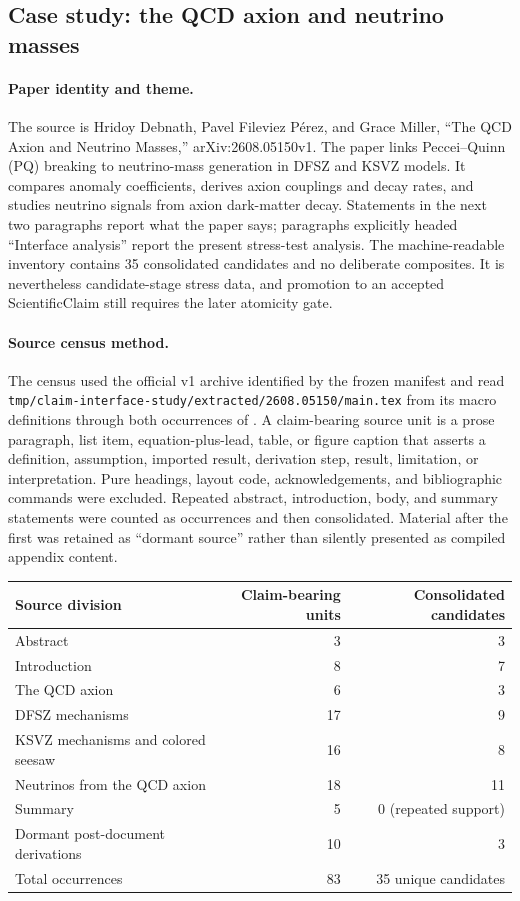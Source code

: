 \subsection{Case study: the QCD axion and neutrino masses}
\label{case:2608-05150}

\paragraph{Paper identity and theme.}
The source is Hridoy Debnath, Pavel Fileviez P\'erez, and Grace Miller,
``The QCD Axion and Neutrino Masses,'' arXiv:2608.05150v1. The paper links
Peccei--Quinn (PQ) breaking to neutrino-mass generation in DFSZ and KSVZ
models. It compares anomaly coefficients, derives axion couplings and decay
rates, and studies neutrino signals from axion dark-matter decay. Statements
in the next two paragraphs report what the paper says; paragraphs explicitly
headed ``Interface analysis'' report the present stress-test analysis. The machine-readable inventory contains 35 consolidated candidates and no deliberate composites. It is nevertheless candidate-stage stress data, and promotion to an accepted ScientificClaim still requires the later atomicity gate.

\paragraph{Source census method.}
The census used the official v1 archive identified by the frozen manifest and
read \texttt{tmp/claim-interface-study/extracted/2608.05150/main.tex} from its
macro definitions through both occurrences of \verb||. A
claim-bearing source unit is a prose paragraph, list item, equation-plus-lead,
table, or figure caption that asserts a definition, assumption, imported
result, derivation step, result, limitation, or interpretation. Pure headings,
layout code, acknowledgements, and bibliographic commands were excluded.
Repeated abstract, introduction, body, and summary statements were counted as
occurrences and then consolidated. Material after the first
\verb|| was retained as ``dormant source'' rather than silently
presented as compiled appendix content.

\begin{center}
\begin{tabular}{lrr}
\hline
Source division & Claim-bearing units & Consolidated candidates \\
\hline
Abstract & 3 & 3 \\
Introduction & 8 & 7 \\
The QCD axion & 6 & 3 \\
DFSZ mechanisms & 17 & 9 \\
KSVZ mechanisms and colored seesaw & 16 & 8 \\
Neutrinos from the QCD axion & 18 & 11 \\
Summary & 5 & 0 (repeated support) \\
Dormant post-document derivations & 10 & 3 \\
\hline
Total occurrences & 83 & 35 unique candidates \\
\hline
\end{tabular}
\end{center}

